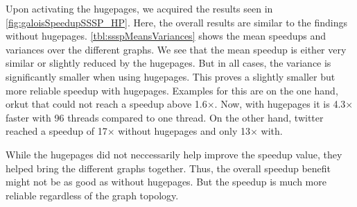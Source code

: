 Upon activating the hugepages, we acquired the results seen in \autoref{fig:galoisSpeedupSSSP_HP}. Here, the overall results are similar to the findings without hugepages. \autoref{tbl:ssspMeansVariances} shows the mean speedups and variances over the different graphs. We see that the mean speedup is either very similar or slightly reduced by the hugepages. But in all cases, the variance is significantly smaller when using hugepages. This proves a slightly smaller but more reliable speedup with hugepages.
Examples for this are on the one hand, orkut that could not reach a speedup above 1.6$\times$. Now, with hugepages it is 4.3$\times$ faster with 96 threads compared to one thread. On the other hand, twitter reached a speedup of 17$\times$ without hugepages and only 13$\times$ with.

While the hugepages did not neccessarily help improve the speedup value, they helped bring the different graphs together. Thus, the overall speedup benefit might not be as good as without hugepages. But the speedup is much more reliable regardless of the graph topology.


